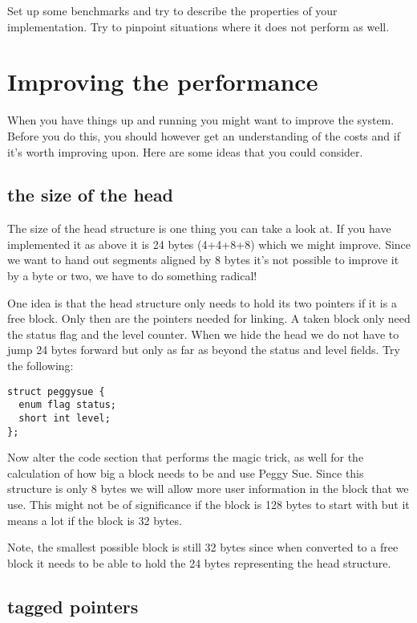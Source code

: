 \documentclass[a4paper,11pt]{article}
\begin{document}
Set up some benchmarks and try to describe the properties of your
implementation. Try to pinpoint situations where it does not perform
as well.

\section{Improving the performance}

When you have things up and running you might want to improve the
system. Before you do this, you should however get an understanding of the
costs and if it's worth improving upon. Here are some ideas that you could consider.

\subsection{the size of the head}

The size of the head structure is one thing you can take a look at. If
you have implemented it as above it is 24 bytes (4+4+8+8) which we
might improve. Since we want to hand out segments aligned by 8 bytes it's not possible to improve it by a byte or two, we have to do something radical!

One idea is that the head structure only needs to hold its two pointers if
it is a free block. Only then are the pointers needed for linking. A
taken block only need the status flag and the level counter. When we hide the
head we do not have to jump 24 bytes forward but only as far as beyond
the status and level fields. Try the following:

\begin{lstlisting}
struct peggysue {
  enum flag status;
  short int level;  
};
\end{lstlisting}

Now alter the code section that performs the magic trick, as well for the calculation of how big a block needs to be and use Peggy Sue. Since this structure is only 8
bytes we will allow more user information in the block that we
use. This might not be of significance if the block is 128 bytes to start with
but it means a lot if the block is 32 bytes.

Note, the smallest possible block is still 32 bytes since when converted to a free
block it needs to be able to hold the 24 bytes representing the head structure. 

\subsection{tagged pointers}
\end{document}
